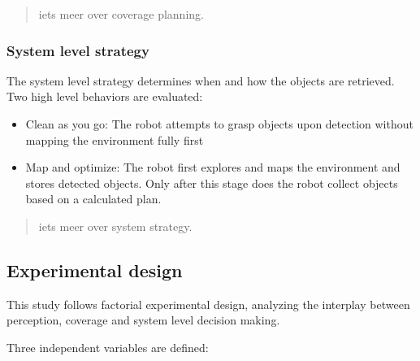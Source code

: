 \begin{quote}
iets meer over coverage planning.
\end{quote}

\subsubsection{System level strategy}

The system level strategy determines when and how the objects are retrieved.
Two high level behaviors are evaluated:

\begin{itemize}
\item Clean as you go: The robot attempts to grasp objects upon detection without mapping the environment fully first
\item Map and optimize: The robot first explores and maps the environment and stores detected objects. Only after this stage does the robot collect objects based on a calculated plan.
\end{itemize}

\begin{quote}
iets meer over system strategy.
\end{quote}

\subsection{Experimental design}

This study follows factorial experimental design, analyzing the interplay between
perception, coverage and system level decision making.

Three independent variables are defined:

